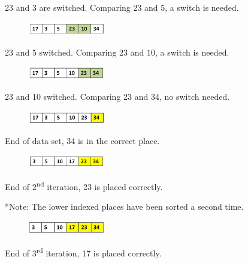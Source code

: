 23 and 3 are switched. Comparing 23 and 5, a switch is needed.

\begin{figure}[H]
\centering
\includegraphics[width=0.3\textwidth]{pictures/bubble5.png}
\label{fig:bubble5}
\end{figure}

23 and 5 switched. Comparing 23 and 10, a switch is needed.

\begin{figure}[H]
\centering
\includegraphics[width=0.3\textwidth]{pictures/bubble6.png}
\label{fig:bubble6}
\end{figure}

23 and 10 switched. Comparing 23 and 34, no switch needed. 

\begin{figure}[H]
\centering
\includegraphics[width=0.3\textwidth]{pictures/bubble7.png}
\label{fig:bubble7}
\end{figure}

End of data set, 34 is in the correct place.

\begin{figure}[H]
\centering
\includegraphics[width=0.3\textwidth]{pictures/bubble8.png}
\label{fig:bubble8}
\end{figure}

End of 2\textsuperscript{nd} iteration, 23 is placed correctly.

*Note: The lower indexed places have been sorted a second time.

\begin{figure}[H]
\centering
\includegraphics[width=0.3\textwidth]{pictures/bubble9.png}
\label{fig:bubble9}
\end{figure}

End of 3\textsuperscript{rd} iteration, 17 is placed correctly.

